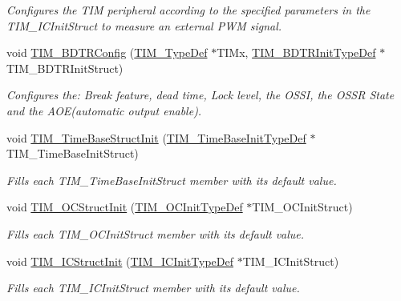 \begin{DoxyCompactItemize}
\begin{DoxyCompactList}\small\item\em Configures the T\+IM peripheral according to the specified parameters in the T\+I\+M\+\_\+\+I\+C\+Init\+Struct to measure an external P\+WM signal. \end{DoxyCompactList}\item 
void \mbox{\hyperlink{group___t_i_m___exported___functions_ga3df4ba3f0727f63ce621e2b2e6035d4f}{T\+I\+M\+\_\+\+B\+D\+T\+R\+Config}} (\mbox{\hyperlink{struct_t_i_m___type_def}{T\+I\+M\+\_\+\+Type\+Def}} $\ast$T\+I\+Mx, \mbox{\hyperlink{struct_t_i_m___b_d_t_r_init_type_def}{T\+I\+M\+\_\+\+B\+D\+T\+R\+Init\+Type\+Def}} $\ast$T\+I\+M\+\_\+\+B\+D\+T\+R\+Init\+Struct)
\begin{DoxyCompactList}\small\item\em Configures the\+: Break feature, dead time, Lock level, the O\+S\+SI, the O\+S\+SR State and the A\+O\+E(automatic output enable). \end{DoxyCompactList}\item 
void \mbox{\hyperlink{group___t_i_m___exported___functions_ga1556a0b9a5d53506875fd7de0cbc6b1f}{T\+I\+M\+\_\+\+Time\+Base\+Struct\+Init}} (\mbox{\hyperlink{struct_t_i_m___time_base_init_type_def}{T\+I\+M\+\_\+\+Time\+Base\+Init\+Type\+Def}} $\ast$T\+I\+M\+\_\+\+Time\+Base\+Init\+Struct)
\begin{DoxyCompactList}\small\item\em Fills each T\+I\+M\+\_\+\+Time\+Base\+Init\+Struct member with its default value. \end{DoxyCompactList}\item 
void \mbox{\hyperlink{group___t_i_m___exported___functions_ga394683c78ae02837882e36014e11643e}{T\+I\+M\+\_\+\+O\+C\+Struct\+Init}} (\mbox{\hyperlink{struct_t_i_m___o_c_init_type_def}{T\+I\+M\+\_\+\+O\+C\+Init\+Type\+Def}} $\ast$T\+I\+M\+\_\+\+O\+C\+Init\+Struct)
\begin{DoxyCompactList}\small\item\em Fills each T\+I\+M\+\_\+\+O\+C\+Init\+Struct member with its default value. \end{DoxyCompactList}\item 
void \mbox{\hyperlink{group___t_i_m___exported___functions_ga5005dac8e4e8a4c7fc2a0ef05b77cc50}{T\+I\+M\+\_\+\+I\+C\+Struct\+Init}} (\mbox{\hyperlink{struct_t_i_m___i_c_init_type_def}{T\+I\+M\+\_\+\+I\+C\+Init\+Type\+Def}} $\ast$T\+I\+M\+\_\+\+I\+C\+Init\+Struct)
\begin{DoxyCompactList}\small\item\em Fills each T\+I\+M\+\_\+\+I\+C\+Init\+Struct member with its default value. \end{DoxyCompactList}\item 

\end{DoxyCompactItemize}
